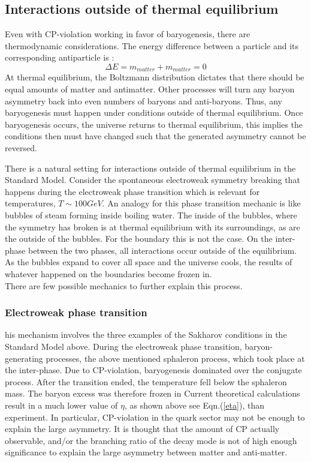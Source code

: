 \subsection{Interactions outside of thermal equilibrium}
Even with CP-violation working in favor of baryogenesis, there are thermodynamic considerations. The energy difference between a particle and its corresponding antiparticle is \cite{5}:
\begin{equation}
\Delta E = m_{matter} + m_{matter} = 0
\end{equation}
At thermal equilibrium, the Boltzmann distribution dictates that there should be equal amounts of matter and antimatter. Other processes will turn any baryon asymmetry back into even numbers of baryons and anti-baryons. Thus, any baryogenesis must happen under conditions outside of thermal equilibrium. Once baryogenesis occurs, the universe returns to thermal equilibrium, this implies the conditions then must have changed such that the generated asymmetry cannot be reversed.\cite{5} \cite{13}
\par There is a natural setting for interactions outside of thermal equilibrium in the Standard Model. Consider the spontaneous electroweak symmetry breaking that happens during the electroweak phase transition  which is relevant for temperatures, $ T \sim 100 GeV $. An analogy for this phase transition mechanic is like bubbles of steam forming inside boiling water. The inside of the bubbles, where the symmetry has broken is at thermal equilibrium with its surroundings, as are the outside of the bubbles. For the boundary this is not the case. On the inter-phase between the two phases, all interactions occur outside of the equilibrium. As the bubbles expand to cover all space and the universe cools, the results of whatever happened on the boundaries become frozen in.\cite{5}\\
There are few possible mechanics to further explain this process.
\subsubsection{Electroweak phase transition}
his mechanism involves the three examples of the Sakharov conditions in the Standard Model above. During the electroweak phase transition, baryon-generating processes, the above mentioned sphaleron process, which took place at the inter-phase. Due to CP-violation, baryogenesis dominated over the conjugate process. After the transition ended, the temperature fell below the sphaleron mass. The baryon excess was therefore frozen in \cite{5} Current theoretical calculations result in a much lower value of $\eta$, as shown above see Eqn.(\ref{eta}), than experiment. In particular, CP-violation in the quark sector may not be enough to explain the large asymmetry. 
It is thought that the amount of CP actually observable, and/or the branching ratio of the decay mode is not of high enough significance to explain the large asymmetry between matter and anti-matter.
